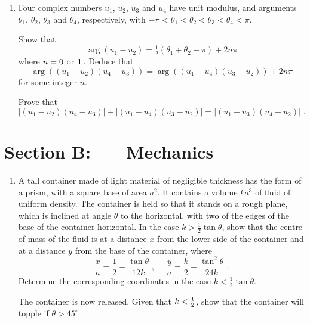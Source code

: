 \documentclass[a4, 11pt]{report}
\newlength{\qspace}
\newcounter{qnumber}
\newenvironment{question}%
 {\vspace{\qspace}
  \begin{enumerate}[\bfseries 1\quad][10]%
    \setcounter{enumi}{\value{qnumber}}%
    \item%
 }
{
  \end{enumerate}
  \filbreak
  \stepcounter{qnumber}
 }
\def\l{\left(}
\def\r{\right)}
\begin{document}
\begin{question}	
Four complex numbers $u_1$, $u_2$, $u_3$ and $u_4$ 
have unit modulus, and arguments $\theta_1$, 
$\theta_2$, $\theta_3$ and $\theta_4$, 
respectively, with $-\pi < \theta_1 < \theta_2 < \theta_3 < \theta_4 < \pi$.

Show that
\[
\arg \l u_1 - u_2 \r  = \tfrac{1}{2} \l  \theta_1 + \theta_2 -\pi \r + 2n\pi
\]
where $n =  0 \hspace{4 pt} \mbox{or} \hspace{4 pt} 1\,$.
Deduce that
\[
\arg \l \l u_1 - u_2 \r \l u_4 - u_3 \r \r 
= \arg \l \l u_1 - u_4 \r \l u_3 - u_2 \r \r + 2n\pi 
\]
for some integer $n$.

Prove that
\[
| \l u_1 - u_2 \r \l u_4 - u_3 \r | + | \l u_1 - u_4 \r \l u_3 - u_2 \r |
= | \l u_1 - u_3 \r \l u_4 - u_2 \r |\;.
\]
\end{question}	
		

		
	
\newpage
\section*{Section B: \ \ \ Mechanics}


	
\begin{question}
A tall container made of light material of negligible thickness has
 the form of a  prism, with a square base  of area $a^2$. It contains 
a volume $ka^3$ of fluid of uniform density. The container is held so that it stands 
on a rough plane, which   is  inclined at angle 
$\theta$ to the horizontal,  with two   
of the edges  of the   base of the container  horizontal. 
In the case $k> \frac12 \tan\theta$, show that the centre of mass of the fluid
is at a distance $x$ from the lower side of the container and at a 
distance $y$ from the base of the container, where
\[
\frac x a = \frac12 - \frac {\tan\theta}{12k}\;,
\ \ \ \ \ \
\frac y a = \frac k 2 + \frac{\tan^2\theta}{24k}\;.
\]
Determine  the corresponding coordinates in the case $k< \frac12 \tan\theta$.


The container is now released.
Given that  $k < {1 \over 2}$, show that the container will topple if $\theta >45^\circ$.
	\end{question}
	
\end{document}
